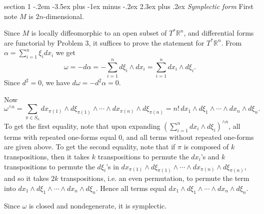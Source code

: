 \documentclass[12pt]{article}
\makeatletter
\theoremstyle{norm}
\newcommand{\R}[0]{\mathbb{R}}
\newcommand{\al}[0]{\alpha}
\newcommand{\om}[0]{\omega}
\newcommand{\pa}[1]{\left( {#1} \right)}
\newenvironment{problem}{\@startsection
       {section}
       {1}
       {-.2em}
       {-3.5ex plus -1ex minus -.2ex}
       {2.3ex plus .2ex}
       {\pagebreak[3]%
       \large\bf\noindent{Problem }
       }
       }
       {%
       }
\makeatother
\begin{document}
\begin{problem}{\it Symplectic form}
First note $M$ is $2n$-dimensional.

Since $M$ is locally diffeomorphic to an open subset of $T^*\R^n$, and differential forms are functorial by Problem 3, it suffices to prove the statement for $T^*\R^n$. From $\al=\sum_{i=1}^n \xi_idx_i$ we get
\[
\om=-d\al=-\sum_{i=1}^n d\xi_i\wedge dx_i=\sum_{i=1}^ndx_i\wedge d\xi_i.
\]
Since $d^2=0$, we have $d\om=-d^2\al=0$. 

Now
\[
\om^{\wedge n}=\sum_{\pi \in S_n}dx_{\pi(1)}\wedge d\xi_{\pi(1)}\wedge \cdots \wedge dx_{\pi(n)}\wedge d\xi_{\pi(n)}=n!\,dx_1\wedge d\xi_1\wedge\cdots \wedge dx_n\wedge d\xi_n.
\]
To get the first equality, note that upon expanding $\pa{\sum_{i=1}^ndx_i\wedge d\xi_i}^{\wedge n}$, all terms with repeated one-forms equal 0, and all terms without repeated one-forms are given above. To get the second equality, note that if $\pi$ is composed of $k$ transpositions, then it takes $k$ transpositions to permute the $dx_i$'s and $k$ transpositions to permute the $d\xi_i$'s in $dx_{\pi(1)}\wedge d\xi_{\pi(1)}\wedge \cdots \wedge dx_{\pi(n)}\wedge d\xi_{\pi(n)}$, and so it takes $2k$ transpositions, i.e. an even permutation, to permute the term into $dx_1\wedge d\xi_1\wedge\cdots \wedge dx_n\wedge d\xi_n$. Hence all terms equal $dx_1\wedge d\xi_1\wedge\cdots \wedge dx_n\wedge d\xi_n$.

Since $\om$ is closed and nondegenerate, it is symplectic.
\end{problem}
\end{document}
